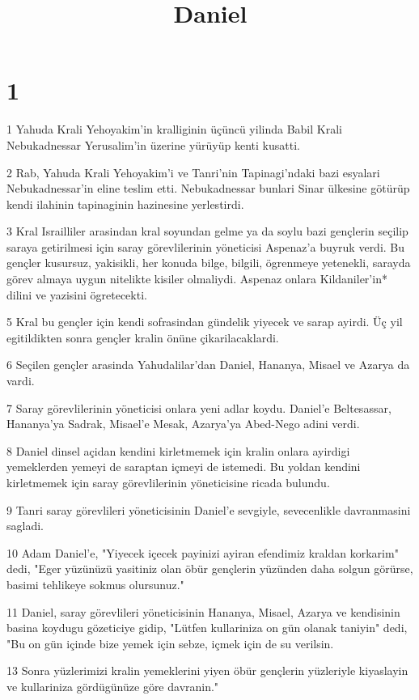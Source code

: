 

\title{Daniel}


\chapter{1}

\par 1 Yahuda Krali Yehoyakim'in kralliginin üçüncü yilinda Babil Krali Nebukadnessar Yerusalim'in üzerine yürüyüp kenti kusatti.
\par 2 Rab, Yahuda Krali Yehoyakim'i ve Tanri'nin Tapinagi'ndaki bazi esyalari Nebukadnessar'in eline teslim etti. Nebukadnessar bunlari Sinar ülkesine götürüp kendi ilahinin tapinaginin hazinesine yerlestirdi.
\par 3 Kral Israilliler arasindan kral soyundan gelme ya da soylu bazi gençlerin seçilip saraya getirilmesi için saray görevlilerinin yöneticisi Aspenaz'a buyruk verdi. Bu gençler kusursuz, yakisikli, her konuda bilge, bilgili, ögrenmeye yetenekli, sarayda görev almaya uygun nitelikte kisiler olmaliydi. Aspenaz onlara Kildaniler'in* dilini ve yazisini ögretecekti.
\par 5 Kral bu gençler için kendi sofrasindan gündelik yiyecek ve sarap ayirdi. Üç yil egitildikten sonra gençler kralin önüne çikarilacaklardi.
\par 6 Seçilen gençler arasinda Yahudalilar'dan Daniel, Hananya, Misael ve Azarya da vardi.
\par 7 Saray görevlilerinin yöneticisi onlara yeni adlar koydu. Daniel'e Beltesassar, Hananya'ya Sadrak, Misael'e Mesak, Azarya'ya Abed-Nego adini verdi.
\par 8 Daniel dinsel açidan kendini kirletmemek için kralin onlara ayirdigi yemeklerden yemeyi de saraptan içmeyi de istemedi. Bu yoldan kendini kirletmemek için saray görevlilerinin yöneticisine ricada bulundu.
\par 9 Tanri saray görevlileri yöneticisinin Daniel'e sevgiyle, sevecenlikle davranmasini sagladi.
\par 10 Adam Daniel'e, "Yiyecek içecek payinizi ayiran efendimiz kraldan korkarim" dedi, "Eger yüzünüzü yasitiniz olan öbür gençlerin yüzünden daha solgun görürse, basimi tehlikeye sokmus olursunuz."
\par 11 Daniel, saray görevlileri yöneticisinin Hananya, Misael, Azarya ve kendisinin basina koydugu gözeticiye gidip, "Lütfen kullariniza on gün olanak taniyin" dedi, "Bu on gün içinde bize yemek için sebze, içmek için de su verilsin.
\par 13 Sonra yüzlerimizi kralin yemeklerini yiyen öbür gençlerin yüzleriyle kiyaslayin ve kullariniza gördügünüze göre davranin."
